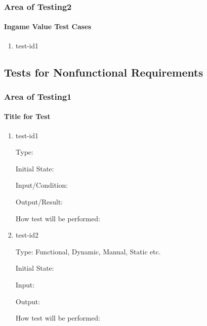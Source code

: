 \documentclass[12pt, titlepage]{article}
\begin{document}
\subsubsection{Area of Testing2}

\paragraph{Ingame Value Test Cases}

\begin{enumerate}

\item{test-id1\\}

\end{enumerate}

\subsection{Tests for Nonfunctional Requirements}

\subsubsection{Area of Testing1}
		
\paragraph{Title for Test}

\begin{enumerate}

\item{test-id1\\}

Type: 
					
Initial State: 
					
Input/Condition: 
					
Output/Result: 
					
How test will be performed: 
					
\item{test-id2\\}

Type: Functional, Dynamic, Manual, Static etc.
					
Initial State: 
					
Input: 
					
Output: 
					
How test will be performed: 

\end{enumerate}
\end{document}
